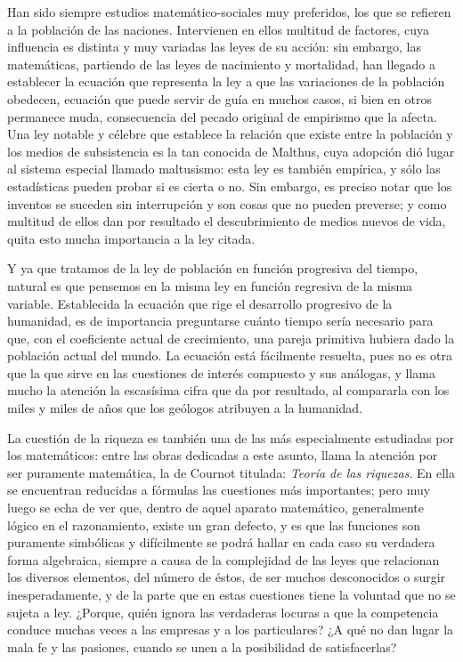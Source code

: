 \documentclass[a4paper, 12pt]{article}
\begin{document}
Han sido siempre estudios matemático-sociales muy preferidos, los que se refieren a la población de las naciones. Intervienen en ellos multitud de factores, cuya influencia es distinta y muy variadas las leyes de su acción: sin embargo, las matemáticas, partiendo de las leyes de nacimiento y mortalidad, han llegado a establecer la ecuación que representa la ley a que las variaciones de la población obedecen, ecuación que puede servir de guía en muchos casos, si bien en otros permanece muda, consecuencia del pecado original de empirismo que la afecta. Una ley notable y célebre que establece la relación que existe entre la población y los medios de subsistencia es la tan conocida de Malthus, cuya adopción dió lugar al sistema especial llamado maltusismo: esta ley es también empírica, y sólo las estadísticas pueden probar si es cierta o no. Sin embargo, es preciso notar que los inventos se suceden sin interrupción y son cosas que no pueden preverse; y como multitud de ellos dan por resultado el descubrimiento de medios nuevos de vida, quita esto mucha importancia a la ley citada.

Y ya que tratamos de la ley de población en función progresiva del tiempo, natural es que pensemos en la misma ley en función regresiva de la misma variable. Establecida la 
ecuación que rige el desarrollo progresivo de la humanidad, es de importancia preguntarse cuánto tiempo sería necesario para que, con el coeficiente actual de crecimiento, una pareja primitiva hubiera dado la población actual del mundo. La ecuación está fácilmente resuelta, pues no es otra que la que sirve en las cuestiones de interés compuesto y sus análogas, y llama mucho la atención la escasísima cifra que da por resultado, al compararla con los miles y miles de años que los geólogos atribuyen a la humanidad.

La cuestión de la riqueza es también una de las más especialmente estudiadas por los matemáticos: entre las obras dedicadas a este asunto, llama la atención por ser puramente matemática, la de Cournot titulada: {\it Teoría de las riquezas}. En ella se encuentran reducidas a fórmulas las cuestiones más importantes; pero muy luego se echa de ver que, dentro de aquel aparato matemático, generalmente lógico en el razonamiento, existe un gran defecto, y es que las funciones son puramente simbólicas y difícilmente se podrá hallar en cada caso su verdadera forma algebraica, siempre a causa de la complejidad de las leyes que relacionan los diversos elementos, del número de éstos, de ser muchos desconocidos o surgir inesperadamente, y de la parte que en estas cuestiones tiene la voluntad que no se sujeta a ley. ¿Porque, quién ignora las verdaderas locuras a que la competencia conduce muchas veces a las empresas y a los particulares? ¿A qué no dan lugar la mala fe y las pasiones, cuando se unen a la posibilidad de satisfacerlas?
\end{document}
